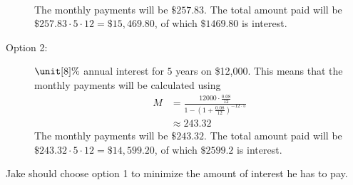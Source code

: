 \begin{problem}
\begin{subproblem}
\begin{shortsolution}
\begin{description}
\begin{align*}
 				\end{align*}
 				The monthly payments will be $\$257.83$. The total amount paid will be
 				$\$257.83\cdot 5\cdot 12=\$15,469.80$, of which $\$1469.80$ is interest.
 				\item[Option 2:] $\unit[8]{\%}$ annual interest for $5$ years on \$12,000.
 				This means that the monthly payments will be calculated using
 				\begin{align*}
 					M & = \frac{12000\cdot \frac{0.08}{12}}{1-\left( 1+\frac{0.08}{12} \right)^{-12\cdot 5}} \\
 					  & \approx 243.32                                                                       
 				\end{align*}
 				The monthly payments will be $\$243.32$. The total amount paid
 				will be $\$243.32\cdot 5\cdot 12 =\$14,599.20$, of which $\$2599.2$ is
 				interest.
 			\end{description}
 			Jake should choose option 1 to minimize the amount of interest
 			he has to pay.
 		\end{shortsolution}
 	\end{subproblem}
 	\end{problem}
 	 	 	
